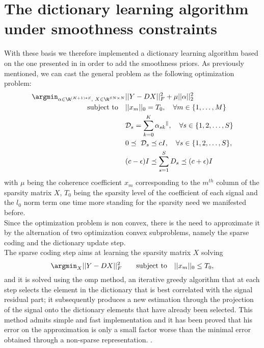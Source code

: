 \section{The dictionary learning algorithm under smoothness constraints}
With these basis we therefore implemented a dictionary learning algorithm based on the one presented in \cite{Thanou2014} in order to add the smoothness priors. As previously mentioned, we can cast the general problem as the following optimization problem:
\begin{align}
  \argmin_{\small{\alpha \in \R^{(K+1)*S}, \text{ } X \in \R^{SN \times N}}} &||Y-DX||^2_F + \mu ||\alpha||_2^2 \label{eq:objDictionary}\\
  \text{subject to} \quad &||x_m||_0 = T_0, \quad \forall m \in \{1,\dots,M\} \notag \\
  &\mathcal{D}_s = \sum_{k=0}^{K}\alpha_{sk}\mathcal{^k}, \quad \forall s \in \{1,2,\dots,S\} \notag \\
  &0 \preceq \text{ } \mathcal{D}_s \preceq cI, \quad \forall s \in \{1,2,\dots , S\},\notag \\
  &(c-\epsilon)I \preceq \sum_{s=1}^{S}D_s \preceq (c+\epsilon)I \notag
\end{align}
with $\mu$ being the coherence coefficient  $x_m$ corresponding to the $m^{th}$ column of the sparsity matrix $X$, $T_0$ being the sparsity level of the coefficient of each signal and the $l_0$ norm term one time more standing for the sparsity need we manifested before.\\

Since the optimization problem is non convex, there is the need to approximate it by the alternation of two optimization convex subproblems, namely the sparse coding and the dictionary update step.\\

The sparse coding step aims at learning the sparsity matrix $X$ solving
\begin{equation}
\argmin_{X} ||Y - DX||^2_F \qquad \text{subject to} \quad ||x_m||_0 \leq T_0,
\end{equation}
and it is solved using the \gls{omp} method, an iterative greedy algorithm that at each step selects the element in the dictionary that is best correlated with the signal residual part; it subsequently produces a new estimation through the projection of the signal onto the dictionary elements that have already been selected. This method admits simple and fast implementation and it has been proved that his error on the approximation is only a small factor worse than the minimal error obtained through a non-sparse representation. \cite{Tropp2004}.\\

